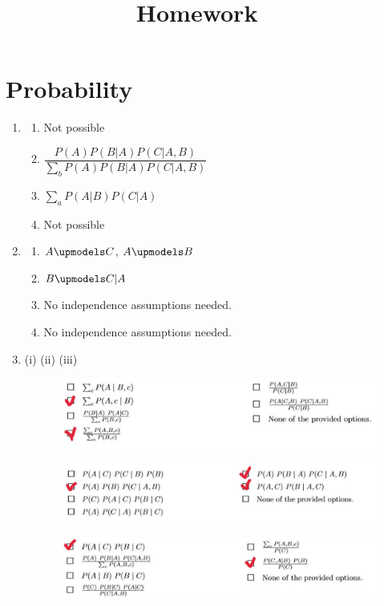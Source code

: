\documentclass[11pt, answers]{exam}
\title{Homework \hmwkNumber\ \hmwkType}
\date{\hmwkDue}
\begin{document}
\maketitle

\section{Probability}
    \begin{enumerate}[a]
    \item
    \begin{enumerate}[i]
    \item
    Not possible
    \item
    $\dfrac{P(A)P(B|A)P(C|A,B)}{\sum_bP(A)P(B|A)P(C|A,B)}$
    \item
    $\sum_aP(A|B)P(C|A)$
    \item
    Not possible
    \end{enumerate}
    \item
    \begin{enumerate}[i]
    \item
    $A\upmodels C$, $A\upmodels B$
    \item
    $B\upmodels C\vert A$
    \item
    No independence assumptions needed.
   	\item
   	No independence assumptions needed.
    \end{enumerate}
    \item
    (i) (ii) (iii)
		\begin{figure}[h]
		\centering
		\includegraphics[scale=0.5]{1.jpg}
		\end{figure}
		
		\begin{figure}[h]
		\centering
		\includegraphics[scale=0.5]{2.jpg}
		\end{figure}
		
		\begin{figure}[h]
		\centering
		\includegraphics[scale=0.5]{3.jpg}
		\end{figure}
    \end{enumerate}
\end{document}
